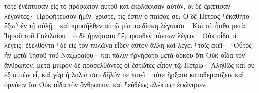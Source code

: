 \documentclass{openreader}
\begin{document}
τότε ἐνέπτυσαν εἰς τὸ πρόσωπον αὐτοῦ καὶ ἐκολάφισαν αὐτόν, οἱ δὲ ἐράπισαν 
λέγοντες· Προφήτευσον ἡμῖν, χριστέ, τίς ἐστιν ὁ παίσας σε; 
Ὁ δὲ Πέτρος ⸂ἐκάθητο ἔξω⸃ ἐν τῇ αὐλῇ· καὶ προσῆλθεν αὐτῷ μία παιδίσκη λέγουσα· Καὶ σὺ ἦσθα μετὰ Ἰησοῦ τοῦ Γαλιλαίου· 
ὁ δὲ ἠρνήσατο ⸀ἔμπροσθεν πάντων λέγων· Οὐκ οἶδα τί λέγεις. 
ἐξελθόντα ⸀δὲ εἰς τὸν πυλῶνα εἶδεν αὐτὸν ἄλλη καὶ λέγει ⸀τοῖς ἐκεῖ· ⸀Οὗτος ἦν μετὰ Ἰησοῦ τοῦ Ναζωραίου· 
καὶ πάλιν ἠρνήσατο μετὰ ὅρκου ὅτι Οὐκ οἶδα τὸν ἄνθρωπον. 
μετὰ μικρὸν δὲ προσελθόντες οἱ ἑστῶτες εἶπον τῷ Πέτρῳ· Ἀληθῶς καὶ σὺ ἐξ αὐτῶν εἶ, καὶ γὰρ ἡ λαλιά σου δῆλόν σε ποιεῖ· 
τότε ἤρξατο καταθεματίζειν καὶ ὀμνύειν ὅτι Οὐκ οἶδα τὸν ἄνθρωπον. καὶ ⸀εὐθέως ἀλέκτωρ ἐφώνησεν· 
\end{document}
